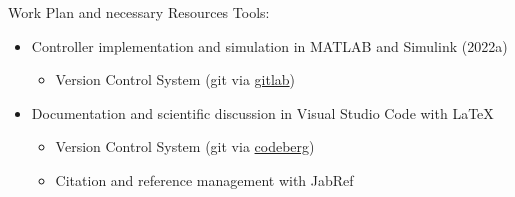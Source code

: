 \begin{frame}{Work Plan and necessary Resources}%
    Tools:
    \begin{itemize}
        \item Controller implementation and simulation in MATLAB\textsuperscript{\tiny\textregistered} and Simulink\textsuperscript{\tiny\textregistered} (2022a)
            \begin{itemize}
                \item Version Control System (git via \href{https://gitlab.lrz.de/}{gitlab})
            \end{itemize}%
        \item Documentation and scientific discussion in Visual Studio Code with \LaTeX
            \begin{itemize}
                \item Version Control System (git via \href{https://codeberg.org/fesch/master-thesis}{codeberg})
                \item Citation and reference management with JabRef
            \end{itemize}%
    \end{itemize}%
\end{frame}%
%